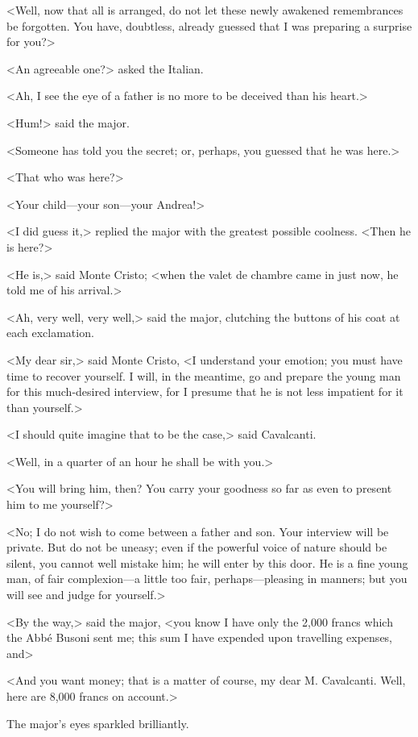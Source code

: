  <Well, now that all is arranged, do not let these newly awakened remembrances be forgotten. You have, doubtless, already guessed that I was preparing a surprise for you?> 

 <An agreeable one?> asked the Italian. 

 <Ah, I see the eye of a father is no more to be deceived than his heart.> 

 <Hum!> said the major. 

 <Someone has told you the secret; or, perhaps, you guessed that he was here.> 

 <That who was here?> 

 <Your child—your son—your Andrea!> 

 <I did guess it,> replied the major with the greatest possible coolness. <Then he is here?> 

 <He is,> said Monte Cristo; <when the valet de chambre came in just now, he told me of his arrival.> 

 <Ah, very well, very well,> said the major, clutching the buttons of his coat at each exclamation. 

 <My dear sir,> said Monte Cristo, <I understand your emotion; you must have time to recover yourself. I will, in the meantime, go and prepare the young man for this much-desired interview, for I presume that he is not less impatient for it than yourself.> 

 <I should quite imagine that to be the case,> said Cavalcanti. 

 <Well, in a quarter of an hour he shall be with you.> 

 <You will bring him, then? You carry your goodness so far as even to present him to me yourself?> 

 <No; I do not wish to come between a father and son. Your interview will be private. But do not be uneasy; even if the powerful voice of nature should be silent, you cannot well mistake him; he will enter by this door. He is a fine young man, of fair complexion—a little too fair, perhaps—pleasing in manners; but you will see and judge for yourself.> 

 <By the way,> said the major, <you know I have only the 2,000 francs which the Abbé Busoni sent me; this sum I have expended upon travelling expenses, and\longdash> 

 <And you want money; that is a matter of course, my dear M. Cavalcanti. Well, here are 8,000 francs on account.> 

 The major's eyes sparkled brilliantly. 

